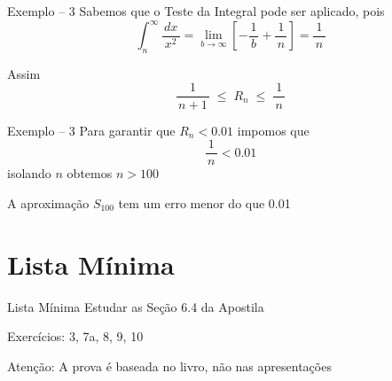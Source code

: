 \documentclass[fleqn,utf8,aspectratio=169,12pt]{beamer}
\begin{document}
\begin{frame}{Exemplo -- 3}
  Sabemos que o Teste da Integral pode ser aplicado, pois
  \[
    \int_n^\infty\frac{\,dx\,}{x^2}
    = \lim_{b\to\infty}\left[ -\frac{1}{\,b\,} + \frac{1}{\,n\,} \right]
    = \frac{1}{\,n\,}
  \]

  \pause
  \vspace{\baselineskip}
  Assim
  \[
    \frac{1}{\,n+1\,} \;\leq\; R_n \;\leq\; \frac{1}{\,n\,}
  \]
\end{frame}

\begin{frame}{Exemplo -- 3}
  Para garantir que $R_n<\num{0.01}$ impomos que
  \[
    \frac{1}{\,n\,} < \num{0.01}
  \]
  isolando $n$ obtemos $n>100$

  \pause
  \vspace{\baselineskip}
  A aproximação $S_{100}$ tem um erro menor do que \num{0.01}
\end{frame}

\section{Lista Mínima}

\begin{frame}{Lista Mínima}
  Estudar as Seção 6.4 da Apostila

  \vspace{\baselineskip}
  Exercícios: 3, 7a, 8, 9, 10

  \vfill
  Atenção: A prova é baseada no livro, não nas apresentações
\end{frame}

\end{document}
